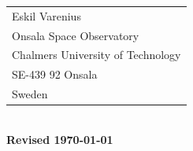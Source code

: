 \begin{titlepage}
\begin{center}
\begin{tabular}{l}
Eskil Varenius\\
Onsala Space Observatory		\\
Chalmers University of Technology	\\
SE-439 92 Onsala			\\
Sweden					\\
\end{tabular}\\
\vspace{0.5cm}
\yyyymmdddate
{\bf Revised \today \, \currenttime}
\end{center}

\end{titlepage}

